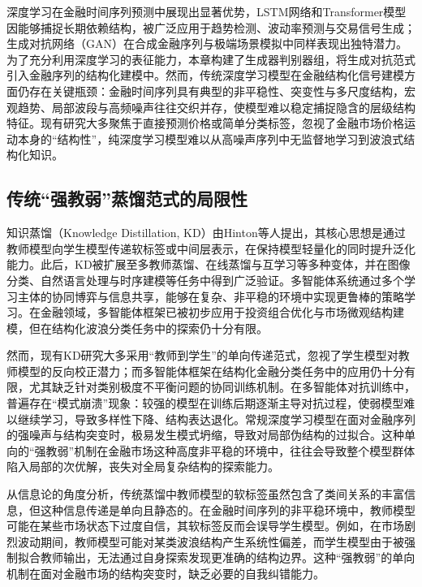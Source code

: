 深度学习在金融时间序列预测中展现出显著优势，LSTM网络和Transformer模型因能够捕捉长期依赖结构，被广泛应用于趋势检测、波动率预测与交易信号生成\cite{fischer2018deep,sirignano2021universal,nelson2017stock}；生成对抗网络（GAN）在合成金融序列与极端场景模拟中同样表现出独特潜力\cite{wiese2020quant,vuletic2024fin}。为了充分利用深度学习的表征能力，本章构建了生成器判别器组，将生成对抗范式引入金融序列的结构化建模中。然而，传统深度学习模型在金融结构化信号建模方面仍存在关键瓶颈：金融时间序列具有典型的非平稳性、突变性与多尺度结构，宏观趋势、局部波段与高频噪声往往交织并存，使模型难以稳定捕捉隐含的层级结构特征\cite{hamilton1989regime,Cont2001Empirical}。现有研究大多聚焦于直接预测价格或简单分类标签\cite{fischer2018deep}，忽视了金融市场价格运动本身的``结构性''，纯深度学习模型难以从高噪声序列中无监督地学习到波浪式结构化知识\cite{OZBAYOGLU2020106384}。

\subsection{传统``强教弱''蒸馏范式的局限性}

知识蒸馏（Knowledge Distillation, KD）由Hinton等人提出，其核心思想是通过教师模型向学生模型传递软标签或中间层表示，在保持模型轻量化的同时提升泛化能力\cite{hinton2015distilling}。此后，KD被扩展至多教师蒸馏、在线蒸馏与互学习等多种变体，并在图像分类、自然语言处理与时序建模等任务中得到广泛验证\cite{gou2021knowledge}。多智能体系统通过多个学习主体的协同博弈与信息共享，能够在复杂、非平稳的环境中实现更鲁棒的策略学习\cite{lee2007multiagent}。在金融领域，多智能体框架已被初步应用于投资组合优化与市场微观结构建模，但在结构化波浪分类任务中的探索仍十分有限。

然而，现有KD研究大多采用``教师到学生''的单向传递范式，忽视了学生模型对教师模型的反向校正潜力；而多智能体框架在结构化金融分类任务中的应用仍十分有限，尤其缺乏针对类别极度不平衡问题的协同训练机制。在多智能体对抗训练中，普遍存在``模式崩溃''现象：较强的模型在训练后期逐渐主导对抗过程，使弱模型难以继续学习，导致多样性下降、结构表达退化\cite{goodfellow2014generative}。常规深度学习模型在面对金融序列的强噪声与结构突变时，极易发生模式坍缩，导致对局部伪结构的过拟合。这种单向的``强教弱''机制在金融市场这种高度非平稳的环境中，往往会导致整个模型群体陷入局部的次优解，丧失对全局复杂结构的探索能力。

从信息论的角度分析，传统蒸馏中教师模型的软标签虽然包含了类间关系的丰富信息，但这种信息传递是单向且静态的。在金融时间序列的非平稳环境中，教师模型可能在某些市场状态下过度自信，其软标签反而会误导学生模型。例如，在市场剧烈波动期间，教师模型可能对某类波浪结构产生系统性偏差，而学生模型由于被强制拟合教师输出，无法通过自身探索发现更准确的结构边界。这种``强教弱''的单向机制在面对金融市场的结构突变时，缺乏必要的自我纠错能力。

